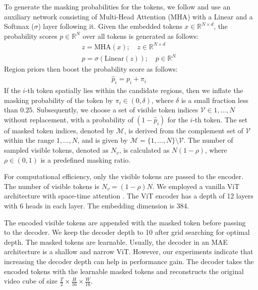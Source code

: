%
To generate the masking probabilities for the tokens, we follow \cite{adamae} and use an auxiliary network consisting of Multi-Head Attention (MHA) with a Linear and a Softmax ($\sigma$) layer following it. Given the embedded tokens $x \in \mathbb{R}^{N \times d}$, the probability scores $p \in \mathbb{R}^N$ over all tokens is generated as follows:
\begin{align}
z = \text{MHA}(x); \quad z \in \mathbb{R}^{N \times d} \\
p = \sigma(\text{Linear}(z)); \quad p \in \mathbb{R}^N
\end{align}
Region priors then boost the probability score as follows:
\begin{align}
\hat{p}_i = p_i + \pi_i 
\end{align}
If the $i$-th token spatially lies within the candidate regions, then we inflate the masking probability of the token by $\pi_i \in(0,\delta)$, where $\delta$ is a small fraction less than $0.25$. 
Subsequently, we choose a set of visible token indices $\mathcal{V} \in {1,\ldots,N}$ without replacement, with a probability of $(1-\hat{p}_i)$ for the $i$-th token. The set of masked token indices, denoted by $\mathcal{M}$, is derived from the complement set of $\mathcal{V}$ within the range ${1,\ldots,N}$, and is given by $\mathcal{M} = \{1,\ldots,N\} \setminus \mathcal{V}$. The number of sampled visible tokens, denoted as $N_v$, is calculated as $N(1 - \rho)$, where $\rho \in (0, 1)$ is a predefined masking ratio. 

%
For computational efficiency, only the visible tokens are passed to the encoder. The number of visible tokens is $N_v = (1-\rho)N$. We employed a vanilla ViT architecture with space-time attention \cite{timesformer}. The ViT encoder has a depth of 12 layers with 6 heads in each layer. The embedding dimension is 384. 

%
The encoded visible tokens are appended with the masked token before passing to the decoder. We keep the decoder depth to 10 after grid searching for optimal depth. The masked tokens are learnable. Usually, the decoder in an MAE architecture is a shallow and narrow ViT. However, our experiments indicate that increasing the decoder depth can help in performance gain. The decoder takes the encoded tokens with the learnable masked tokens and reconstructs the original video cube of size $\frac{T}{2}\times\frac{H}{16}\times\frac{W}{16}$.


